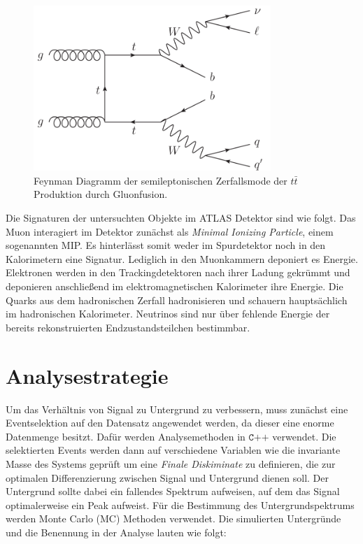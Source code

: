 \begin{figure}
  \centering
  \includegraphics[width=0.8\textwidth]{content/graphics/pictures/Gluonfusion.png}
  \caption{Feynman Diagramm der semileptonischen Zerfallsmode der $t\bar{t}$ Produktion durch Gluonfusion.}
  \label{fig:gluonfusion}
\end{figure}

Die Signaturen der untersuchten Objekte im ATLAS Detektor sind wie folgt. Das Muon interagiert im Detektor zunächst als \textit{Minimal Ionizing Particle},
einem sogenannten MIP. Es hinterlässt somit weder im Spurdetektor noch in den Kalorimetern eine Signatur. Lediglich in den Muonkammern deponiert es
Energie. Elektronen werden in den Trackingdetektoren nach ihrer Ladung gekrümmt und deponieren anschließend im elektromagnetischen Kalorimeter ihre
Energie. Die Quarks aus dem hadronischen Zerfall hadronisieren und schauern hauptsächlich im hadronischen Kalorimeter. Neutrinos sind nur über fehlende
Energie der bereits rekonstruierten Endzustandsteilchen bestimmbar.

\section{Analysestrategie}
Um das Verhältnis von Signal zu Untergrund zu verbessern, muss zunächst eine Eventselektion auf den Datensatz angewendet werden, da dieser eine enorme
Datenmenge besitzt. Dafür werden Analysemethoden in $\texttt{C++}$ verwendet. Die selektierten Events werden dann auf verschiedene Variablen wie die
invariante Masse des Systems geprüft um eine \textit{Finale Diskiminate} zu definieren, die zur optimalen Differenzierung zwischen Signal und
Untergrund dienen soll. Der Untergrund sollte dabei ein fallendes Spektrum aufweisen, auf dem das Signal optimalerweise ein Peak aufweist. Für die
Bestimmung des Untergrundspektrums werden Monte Carlo (MC) Methoden verwendet. Die simulierten Untergründe und die Benennung in der Analyse lauten
wie folgt:

